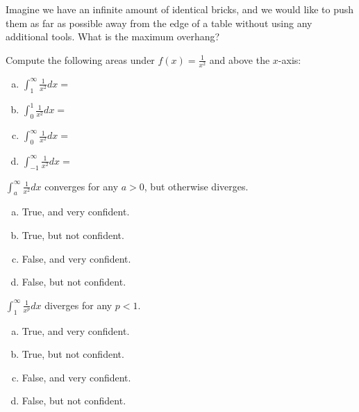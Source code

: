 \documentclass[answers]{exam}
\begin{document}
\begin{questions}


\question Imagine we have an infinite amount of identical bricks, and we would like to push them as far as possible away from the edge of a table without using any additional tools. What is the maximum overhang?
 
\vspace{2in }

\question Compute the following areas under $f(x) = \frac{1}{x^2}$ and above the $x$-axis:

\begin{enumerate}[(a)]
	\item $\displaystyle \int_{1}^{\infty} \frac{1}{x^2} dx =$
	
	\vspace{1in}
	
	\item $\displaystyle \int_{0}^{1} \frac{1}{x^2} dx =$
	
	\vspace{.6in}
	
	\item $\displaystyle \int_{0}^{\infty} \frac{1}{x^2} dx =$
	
	\item $\displaystyle \int_{-1}^{\infty} \frac{1}{x^2} dx =$
	
	
\end{enumerate}

\question $\displaystyle \int_{a}^{\infty} \frac{1}{x^2} dx$ converges for any $a > 0$, but otherwise diverges.

\begin{enumerate}[(a)]
	\item True, and very confident.
	\item True, but not confident.
	\item False, and very confident.
	\item False, but not confident.
\end{enumerate}

\question $\displaystyle \int_{1}^{\infty} \frac{1}{x^p} dx$ diverges for any $p < 1$.

\begin{enumerate}[(a)]
	\item True, and very confident.
	\item True, but not confident.
	\item False, and very confident.
	\item False, but not confident.
\end{enumerate}




\end{questions}
\end{document}
